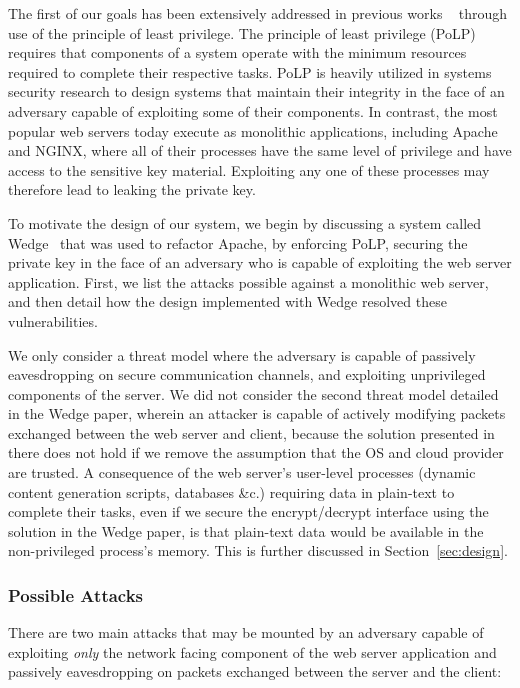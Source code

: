 \documentclass[../main.tex]{subfiles}
\begin{document}
The first of our goals has been extensively addressed in previous
works ~\cite{Bittau08, Krohn2004} through use of the principle of
least privilege. The principle of least privilege (PoLP) requires
that components of a system operate with the minimum resources
required to complete their respective tasks. PoLP is heavily utilized
in systems security research to design systems that maintain their
integrity in the face of an adversary capable of exploiting some of
their components. In contrast, the most popular web servers today
execute as monolithic applications, including Apache and NGINX, where
all of their processes have the same level of privilege and have
access to the sensitive key material. Exploiting any one of these
processes may therefore lead to leaking the private key.

To motivate the design of our system, we begin by discussing a system
called Wedge~\cite{Bittau08} that was used to refactor Apache, by
enforcing PoLP, securing the private key in the face of an adversary
who is capable of exploiting the web server application. First, we
list the attacks possible against a monolithic web server, and then
detail how the design implemented with Wedge resolved these
vulnerabilities.

We only consider a threat model where the adversary is capable of
passively eavesdropping on secure communication channels, and
exploiting unprivileged components of the server. We did not consider
the second threat model detailed in the Wedge paper, wherein an
attacker is capable of actively modifying packets exchanged between
the web server and client, because the solution presented in there
does not hold if we remove the assumption that the OS and cloud
provider are trusted. A consequence of the web server's user-level
processes (dynamic content generation scripts, databases \&c.)
requiring data in plain-text to complete their tasks, even if we secure
the encrypt/decrypt interface using the solution in the Wedge paper,
is that plain-text data would be available in the non-privileged process's
memory. This is further discussed in Section~\ref{sec:design}.


\subsubsection*{Possible Attacks}

There are two main attacks that may be mounted by an adversary capable
of exploiting \textit{only} the network facing component of the web
server application and passively eavesdropping on packets exchanged
between the server and the client:
\end{document}
